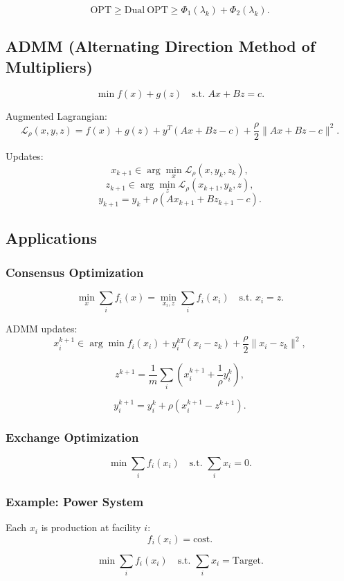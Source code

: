 \documentclass[12pt,oneside]{book}
\numberwithin{equation}{section}
\theoremstyle{definition}
\theoremstyle{plain}
\theoremstyle{remark}
\begin{document}
\[
\mathrm{OPT} \ge \mathrm{Dual\ OPT} \ge \Phi_1(\lambda_k) + \Phi_2(\lambda_k).
\]

\subsection{ADMM (Alternating Direction Method of Multipliers)}

\[
\min f(x) + g(z)
\quad \text{s.t. } Ax + Bz = c.
\]

Augmented Lagrangian:
\[
\mathcal{L}_\rho(x,y,z)
=
f(x) + g(z) + y^T(Ax + Bz - c)
+ \frac{\rho}{2}\|Ax + Bz - c\|^2.
\]

Updates:
\[
x_{k+1} \in \arg\min_x \mathcal{L}_\rho(x,y_k,z_k),
\]
\[
z_{k+1} \in \arg\min_z \mathcal{L}_\rho(x_{k+1},y_k,z),
\]
\[
y_{k+1} = y_k + \rho(Ax_{k+1} + Bz_{k+1} - c).
\]

\subsection{Applications}

\subsubsection{Consensus Optimization}

\[
\min_x \sum_i f_i(x)
=
\min_{x_i,z} \sum_i f_i(x_i)
\quad \text{s.t. } x_i = z.
\]

ADMM updates:
\[
x_i^{k+1}
\in \arg\min
f_i(x_i) + y_i^{kT}(x_i - z_k)
+ \frac{\rho}{2}\|x_i - z_k\|^2,
\]

\[
z^{k+1} = \frac{1}{m} \sum_i \left(x_i^{k+1} + \frac{1}{\rho} y_i^k \right),
\]

\[
y_i^{k+1} = y_i^k + \rho(x_i^{k+1} - z^{k+1}).
\]

\subsubsection{Exchange Optimization}

\[
\min \sum_i f_i(x_i)
\quad \text{s.t. } \sum_i x_i = 0.
\]

\subsubsection{Example: Power System}

Each $x_i$ is production at facility $i$:
\[
f_i(x_i) = \text{cost}.
\]

\[
\min \sum_i f_i(x_i)
\quad \text{s.t. } \sum_i x_i = \text{Target}.
\]
\end{document}
